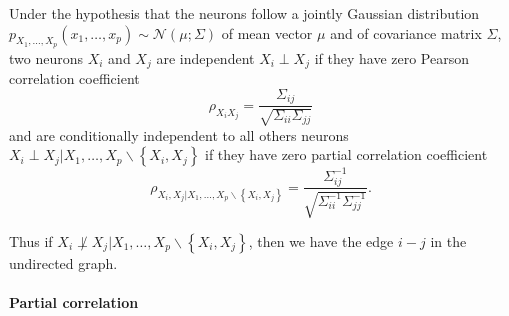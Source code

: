 \documentclass[wcp]{jmlr}
\begin{document}
Under the hypothesis that the neurons follow a jointly Gaussian distribution
$p_{X_1,\ldots,X_p}(x_1,\ldots,x_p) \sim \mathcal{N}(\mu; \Sigma)$
of mean vector $\mu$ and of covariance matrix $\Sigma$, two neurons $X_i$
and $X_j$ are independent $X_i \perp X_j$ if they have zero Pearson correlation
coefficient
\[
\rho_{X_iX_j} = \frac{\Sigma_{ij}}{\sqrt{\Sigma_{ii} \Sigma_{jj}}}
\]
and are conditionally independent to all others neurons
$X_i \perp X_j | X_1,\ldots,X_p \backslash \left\{X_i, X_j\right\}$ if they
have zero partial correlation coefficient
\[
\rho_{X_i, X_j | X_1,\ldots,X_p \backslash \left\{X_i, X_j\right\}} =
\frac{\Sigma^{-1}_{ij}}{\sqrt{\Sigma^{-1}_{ii} \Sigma^{-1}_{jj}}}.
\]


Thus if $X_i \not\perp X_j | X_1,\ldots,X_p \backslash \left\{X_i, X_j\right\}$,
then we have the edge $i-j$ in the undirected graph.





\paragraph{Partial correlation\\}
\end{document}
